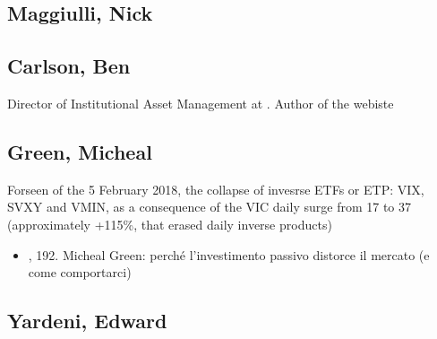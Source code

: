 \documentclass[letterpaper,10pt,english]{jupyterBook}
\begin{document}
\subsection{Maggiulli, Nick}
\label{\detokenize{ch/people/list:maggiulli-nick}}\label{\detokenize{ch/people/list:fin-edu-resources-people-maggiulli}}

\subsection{Carlson, Ben}
\label{\detokenize{ch/people/list:carlson-ben}}\label{\detokenize{ch/people/list:fin-edu-resources-people-carlson}}
\sphinxAtStartPar
Director of Institutional Asset Management at {\hyperref[\detokenize{ch/people/list:fin-edu-resources-firms-ritholtz}]{}}. Author of the webiste 


\subsection{Green, Micheal}
\label{\detokenize{ch/people/list:green-micheal}}\label{\detokenize{ch/people/list:fin-edu-resources-people-green}}
\sphinxAtStartPar
Forseen  of the 5 February 2018, the collapse of invesrse ETFs or ETP: VIX, SVXY and VMIN, as a consequence of the VIC daily surge from 17 to 37 (approximately +115\%, that erased daily inverse products)

\sphinxAtStartPar
{}
\begin{itemize}
\item {} 
\sphinxAtStartPar
{\hyperref[\detokenize{ch/people/the_bull_guests:fin-edu-resources-the-bull}]{}}, 192. Micheal Green: perché l’investimento passivo distorce il mercato (e come comportarci)

\end{itemize}


\subsection{Yardeni, Edward}
\label{\detokenize{ch/people/list:yardeni-edward}}\label{\detokenize{ch/people/list:fin-edu-resources-people-yardeni}}
\end{document}
